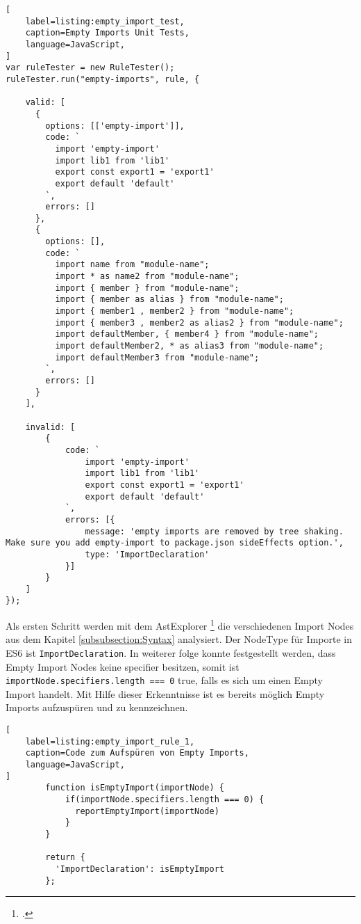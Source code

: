 \begin{lstlisting}[
    label=listing:empty_import_test,
	caption=Empty Imports Unit Tests,
	language=JavaScript,
]
var ruleTester = new RuleTester();
ruleTester.run("empty-imports", rule, {

    valid: [
      {
        options: [['empty-import']],
        code: `
          import 'empty-import'
          import lib1 from 'lib1'
          export const export1 = 'export1'
          export default 'default'
        `,
        errors: []
      },
      {
        options: [],
        code: `
          import name from "module-name";
          import * as name2 from "module-name";
          import { member } from "module-name";
          import { member as alias } from "module-name";
          import { member1 , member2 } from "module-name";
          import { member3 , member2 as alias2 } from "module-name";
          import defaultMember, { member4 } from "module-name";
          import defaultMember2, * as alias3 from "module-name";
          import defaultMember3 from "module-name";
        `,
        errors: []
      }
    ],

    invalid: [
        {
            code: `
                import 'empty-import'
                import lib1 from 'lib1'
                export const export1 = 'export1'
                export default 'default'
            `,
            errors: [{
                message: 'empty imports are removed by tree shaking. Make sure you add empty-import to package.json sideEffects option.',
                type: 'ImportDeclaration'
            }]
        }
    ]
});
\end{lstlisting}

Als ersten Schritt werden mit dem AstExplorer \footcite{https://astexplorer.net/ - besucht am 26.06.2018} die 
verschiedenen Import Nodes aus dem Kapitel \ref{subsubsection:Syntax} analysiert. Der NodeType für Importe in ES6 ist \lstinline{ImportDeclaration}. In weiterer folge konnte festgestellt werden, dass Empty Import Nodes keine specifier besitzen, somit ist \lstinline{importNode.specifiers.length === 0} true, falls es sich um einen Empty Import handelt. Mit Hilfe dieser Erkenntnisse ist es bereits möglich Empty Imports aufzuspüren und zu kennzeichnen.

\begin{lstlisting}[
    label=listing:empty_import_rule_1,
	caption=Code zum Aufspüren von Empty Imports,
	language=JavaScript,
]
        function isEmptyImport(importNode) {
            if(importNode.specifiers.length === 0) {
              reportEmptyImport(importNode)
            }
        }

        return {
          'ImportDeclaration': isEmptyImport
        };
\end{lstlisting}

